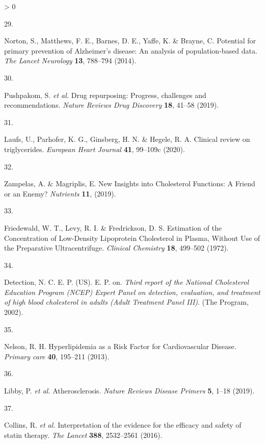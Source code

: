 \documentclass[a4paper, twoside]{templates/ociamthesis}
\newlength{\cslhangindent}
\newlength{\csllabelwidth}
\newenvironment{CSLReferences}[3] %
 {%
  \setlength{\parindent}{0pt}
  \ifodd #1 \everypar{\setlength{\hangindent}{\cslhangindent}}\ignorespaces\fi
  \ifnum #2 > 0
  \setlength{\parskip}{#2\baselineskip}
  \fi
 }%
 {}
\newcommand{\CSLLeftMargin}[1]{\parbox[t]{\maxof{\widthof{#1}}{\csllabelwidth}}{#1}}
\newcommand{\CSLRightInline}[1]{\parbox[t]{\linewidth - \csllabelwidth}{#1}}
\begin{document}
\begin{CSLReferences}{0}{0}
\leavevmode\hypertarget{ref-norton2014potential}{}%
\CSLLeftMargin{29. }
\CSLRightInline{Norton, S., Matthews, F. E., Barnes, D. E., Yaffe, K. \& Brayne, C. Potential for primary prevention of {Alzheimer}'s disease: An analysis of population-based data. \emph{The Lancet Neurology} \textbf{13}, 788--794 (2014).}

\leavevmode\hypertarget{ref-pushpakom2019}{}%
\CSLLeftMargin{30. }
\CSLRightInline{Pushpakom, S. \emph{et al.} Drug repurposing: Progress, challenges and recommendations. \emph{Nature Reviews Drug Discovery} \textbf{18}, 41--58 (2019).}

\leavevmode\hypertarget{ref-laufs2020}{}%
\CSLLeftMargin{31. }
\CSLRightInline{Laufs, U., Parhofer, K. G., Ginsberg, H. N. \& Hegele, R. A. Clinical review on triglycerides. \emph{European Heart Journal} \textbf{41}, 99--109c (2020).}

\leavevmode\hypertarget{ref-zampelas2019}{}%
\CSLLeftMargin{32. }
\CSLRightInline{Zampelas, A. \& Magriplis, E. New {Insights} into {Cholesterol Functions}: A {Friend} or an {Enemy}? \emph{Nutrients} \textbf{11}, (2019).}

\leavevmode\hypertarget{ref-friedewald1972}{}%
\CSLLeftMargin{33. }
\CSLRightInline{Friedewald, W. T., Levy, R. I. \& Fredrickson, D. S. Estimation of the {Concentration} of {Low}-{Density Lipoprotein Cholesterol} in {Plasma}, {Without Use} of the {Preparative Ultracentrifuge}. \emph{Clinical Chemistry} \textbf{18}, 499--502 (1972).}

\leavevmode\hypertarget{ref-national2002third}{}%
\CSLLeftMargin{34. }
\CSLRightInline{Detection, N. C. E. P. (US). E. P. on. \emph{Third report of the {National Cholesterol Education Program} ({NCEP}) {Expert Panel} on detection, evaluation, and treatment of high blood cholesterol in adults ({Adult Treatment Panel III})}. ({The Program}, 2002).}

\leavevmode\hypertarget{ref-nelson2013}{}%
\CSLLeftMargin{35. }
\CSLRightInline{Nelson, R. H. Hyperlipidemia as a {Risk Factor} for {Cardiovascular Disease}. \emph{Primary care} \textbf{40}, 195--211 (2013).}

\leavevmode\hypertarget{ref-libby2019}{}%
\CSLLeftMargin{36. }
\CSLRightInline{Libby, P. \emph{et al.} Atherosclerosis. \emph{Nature Reviews Disease Primers} \textbf{5}, 1--18 (2019).}

\leavevmode\hypertarget{ref-collins2016}{}%
\CSLLeftMargin{37. }
\CSLRightInline{Collins, R. \emph{et al.} Interpretation of the evidence for the efficacy and safety of statin therapy. \emph{The Lancet} \textbf{388}, 2532--2561 (2016).}


\end{CSLReferences}
\end{document}

